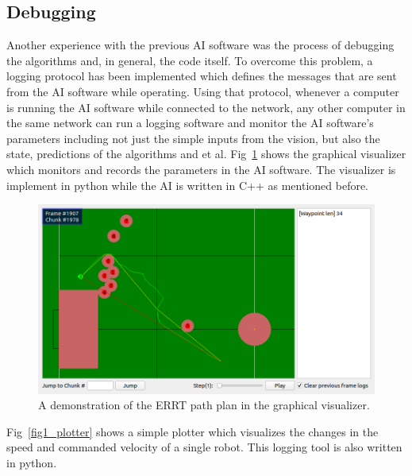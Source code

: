 \documentclass[runningheads]{llncs}
\begin{document}
\subsection{Debugging}
Another experience with the previous AI software was the process of debugging the algorithms and, in general, the code itself. To overcome this problem, a logging protocol has been implemented which defines the messages that are sent from the AI software while operating. Using that protocol, whenever a computer is running the AI software while connected to the network, any other computer in the same network can run a logging software and monitor the AI software's parameters including not just the simple inputs from the vision, but also the state, predictions of the algorithms and et al. Fig~\ref{fig_visualizer} shows the graphical visualizer which monitors and records the parameters in the AI software. The visualizer is implement in python while the AI is written in C++ as mentioned before.

\begin{figure}
\includegraphics[width=\textwidth]{images/visual1.png}
\caption{A demonstration of the ERRT path plan in the graphical visualizer.} \label{fig_visualizer}
\end{figure}

Fig~\ref{fig1_plotter} shows a simple plotter which  visualizes the changes in the speed and commanded velocity of a single robot. This logging tool is also written in python.
\end{document}
